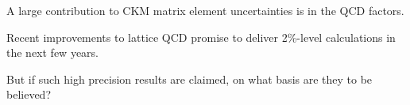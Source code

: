



 

\begin{slide*}

\slideframe{}
\huge
{}

\begin{minipage}[t]{\linewidth}
\Large A large contribution to CKM matrix element uncertainties is in
the QCD factors.

\vspace{1 cm}


\vspace{1 cm}

Recent improvements to lattice QCD promise to deliver 2\%-level
calculations in the next few years.

\vspace{1 cm}

{\huge But if such high precision results are claimed, on what basis
are they to be believed?}

\end{minipage}

\end{slide*}


